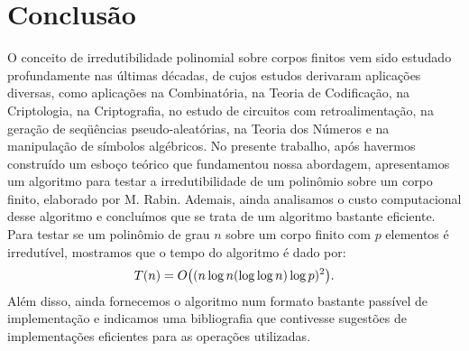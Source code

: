 
\chapter{Conclusão}

O conceito de irredutibilidade polinomial sobre corpos finitos vem sido
estudado profundamente nas últimas décadas, de cujos estudos derivaram
aplicações diversas, como aplicações na Combinatória, na Teoria de
Codificação, na
Criptologia, na Criptografia, no estudo de circuitos com
retroalimentação, na geração de seqüências pseudo-aleatórias, na Teoria
dos Números e na manipulação de símbolos algébricos. No presente
trabalho, após havermos construído um esboço teórico que fundamentou
nossa abordagem, apresentamos um algoritmo para testar a
irredutibilidade de um polinômio sobre um corpo finito, elaborado por
M. Rabin\cite{pralgffrabin}. Ademais,
ainda analisamos o custo computacional desse algoritmo e concluímos que
se trata de um algoritmo bastante eficiente. Para testar se um polinômio
de grau $n$ sobre um corpo finito com $p$ elementos é irredutível,
 mostramos que
o tempo do
algoritmo é dado por:
\begin{equation*}
  T(n) = O\bigl((n\log{n}(\log{\log{n}})\log{p})^2\bigr)\mathrm{.}
\end{equation*}
Além disso, ainda fornecemos o algoritmo num formato bastante passível
de implementação e indicamos uma bibliografia que contivesse
 sugestões de
im\-ple\-men\-ta\-ções eficientes para as operações utilizadas.



